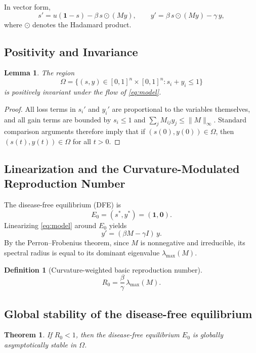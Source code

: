 \documentclass[final,3p,times,twocolumn]{elsarticle}
\newtheorem{theorem}{Theorem}
\newtheorem{lemma}{Lemma}
\newtheorem{definition}{Definition}
\begin{document}
In vector form,
\[
    s' = u(\mathbf{1}-s) - \beta\, s \odot (My),
    \qquad
    y' = \beta\, s \odot (My) - \gamma\, y,
\]
where $\odot$ denotes the Hadamard product.

\subsection{Positivity and Invariance}

\begin{lemma}
The region
\[
    \Omega 
    = 
    \{(s,y)\in [0,1]^n \times [0,1]^n : s_i + y_i \le 1 \}
\]
is positively invariant under the flow of \eqref{eq:model}.
\end{lemma}

\begin{proof}
All loss terms in $s_i'$ and $y_i'$ are proportional to the variables 
themselves, and all gain terms are bounded by $s_i \le 1$ and 
$\sum_j M_{ij} y_j \le \|M\|_\infty$.  
Standard comparison arguments therefore imply that if 
$(s(0),y(0)) \in \Omega$, then $(s(t),y(t)) \in \Omega$ for all $t>0$.
\end{proof}

\subsection{Linearization and the Curvature-Modulated Reproduction Number}

The disease-free equilibrium (DFE) is
\[
    E_0 = (s^*,y^*) = (\mathbf{1},\mathbf{0}).
\]
Linearizing \eqref{eq:model} around $E_0$ yields
\[
    y' = (\beta M - \gamma I)\, y.
\]
By the Perron--Frobenius theorem, since $M$ is nonnegative and irreducible,
its spectral radius is equal to its dominant eigenvalue $\lambda_{\max}(M)$.

\begin{definition}[Curvature-weighted basic reproduction number]
\[
    R_0 = \frac{\beta}{\gamma}\,\lambda_{\max}(M).
\]
\end{definition}

\subsection{Global stability of the disease-free equilibrium}

\begin{theorem}
\label{thm:globalDFE}
If $R_0 < 1$, then the disease-free equilibrium $E_0$ is globally
asymptotically stable in $\Omega$.
\end{theorem}
\end{document}

